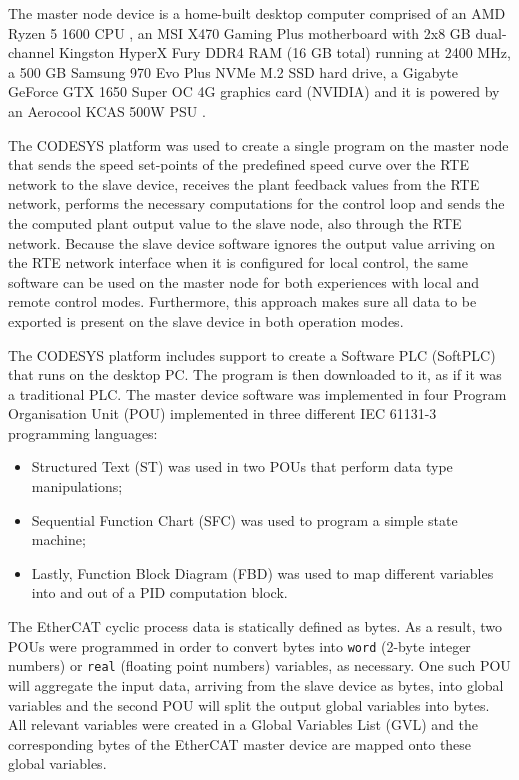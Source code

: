 The master node device is a home-built desktop computer comprised of an AMD Ryzen\texttrademark{} 5 1600 CPU \cite{hdw:ryzen5-1600}, an MSI X470 Gaming Plus \cite{hdw:msi-x470} motherboard with 2x8 GB dual-channel Kingston HyperX Fury DDR4 RAM (16 GB total) \cite{hdw:hyperx-fury-8gb-ddr4-2400} running at 2400 MHz, a 500 GB Samsung 970 Evo Plus NVMe\textregistered{} M.2 SSD \cite{hdw:970evo-plus-ssd} hard drive, a Gigabyte GeForce\textregistered{} GTX 1650 Super\texttrademark{} OC 4G \cite{hdw:gigabyte-1650-super-oc} graphics card (NVIDIA) and it is powered by an Aerocool KCAS 500W PSU \cite{hdw:kcas-500w}.

The CODESYS platform was used to create a single program on the master node that sends the speed set-points of the predefined speed curve over the RTE network to the slave device, receives the plant feedback values from the RTE network, performs the necessary computations for the control loop and sends the the computed plant output value to the slave node, also through the RTE network.
Because the slave device software ignores the output value arriving on the RTE network interface when it is configured for local control, the same software can be used on the master node for both experiences with local and remote control modes.
Furthermore, this approach makes sure all data to be exported is present on the slave device in both operation modes.

The CODESYS platform includes support to create a Software PLC (SoftPLC) that runs on the desktop PC.
The program is then downloaded to it, as if it was a traditional PLC.
The master device software was implemented in four Program Organisation Unit (POU) implemented in three different IEC 61131-3 programming languages: 
\begin{itemize}
	\item Structured Text (ST) was used in two POUs that perform data type manipulations;
	\item Sequential Function Chart (SFC) was used to program a simple state machine;
	\item Lastly, Function Block Diagram (FBD) was used to map different variables into and out of a PID computation block.
\end{itemize}

The EtherCAT cyclic process data is statically defined as bytes.
As a result, two POUs were programmed in order to convert bytes into \verb|word| (2-byte integer numbers) or \verb|real| (floating point numbers) variables, as necessary.
One such POU will aggregate the input data, arriving from the slave device as bytes, into global variables and the second POU will split the output global variables into bytes.
All relevant variables were created in a Global Variables List (GVL) and the corresponding bytes of the EtherCAT master device are mapped onto these global variables.

